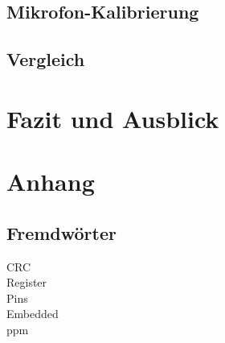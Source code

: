 \documentclass[12pt]{article}
\begin{document}
	\subsection{Mikrofon-Kalibrierung}
	\subsection{Vergleich}
	
	\newpage
	\section{Fazit und Ausblick}
	
	\newpage
	\section{Anhang}
	 
	
	\listoffigures
	\subsection{Fremdwörter}
	CRC \\
	Register \\
	Pins \\
	Embedded \\
	ppm \\
	
	
	
	
\end{document}
